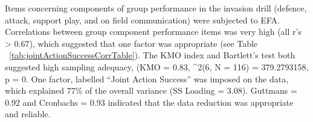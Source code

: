 \documentclass[english]{article}\usepackage[]{graphicx}\usepackage[]{color}
\makeatletter
\newenvironment{kframe}{%
 \def\at@end@of@kframe{}%
 \ifinner\ifhmode%
  \def\at@end@of@kframe{\end{minipage}}%
  \begin{minipage}{\columnwidth}%
 \fi\fi%
 \def\FrameCommand##1{\hskip\@totalleftmargin \hskip-\fboxsep
 \colorbox{shadecolor}{##1}\hskip-\fboxsep
     \hskip-\linewidth \hskip-\@totalleftmargin \hskip\columnwidth}%
 \MakeFramed {\advance\hsize-\width
   \@totalleftmargin\z@ \linewidth\hsize
   \@setminipage}}%
 {\par\unskip\endMakeFramed%
 \at@end@of@kframe}
\newenvironment{knitrout}{}{} %
\makeatother
\begin{document}
\begin{knitrout}
\color{fgcolor}\begin{kframe}


{\ttfamily\noindent\itshape\color{messagecolor}{\#\# Loading required package: Hmisc}}

{\ttfamily\noindent\color{warningcolor}{\#\# Warning: package 'Hmisc' was built under R version 3.3.2}}

{\ttfamily\noindent\itshape\color{messagecolor}{\#\# Loading required package: lattice}}

{\ttfamily\noindent\itshape\color{messagecolor}{\#\# Loading required package: survival}}

{\ttfamily\noindent\itshape\color{messagecolor}{\#\# Loading required package: Formula}}

{\ttfamily\noindent\itshape\color{messagecolor}{\#\# \\\#\# Attaching package: 'Hmisc'}}

{\ttfamily\noindent\itshape\color{messagecolor}{\#\# The following object is masked from 'package:psych':\\\#\# \\\#\#\ \ \ \  describe}}

{\ttfamily\noindent\itshape\color{messagecolor}{\#\# The following objects are masked from 'package:dplyr':\\\#\# \\\#\#\ \ \ \  combine, src, summarize}}

{\ttfamily\noindent\itshape\color{messagecolor}{\#\# The following objects are masked from 'package:xtable':\\\#\# \\\#\#\ \ \ \  label, label<-}}

{\ttfamily\noindent\itshape\color{messagecolor}{\#\# The following objects are masked from 'package:base':\\\#\# \\\#\#\ \ \ \  format.pval, round.POSIXt, trunc.POSIXt, units}}\end{kframe}
\end{knitrout}

Items concerning components of group performance in the invasion drill (defence, attack, support play, and on field communication) were subjected to EFA.  
Correlations between group component performance items was very high (all r's > 0.67), which suggested that one factor was appropriate (see Table ~\ref{tab:jointActionSuccessCorrTable}). 
The KMO index and Bartlett's test both suggested high sampling adequacy, (KMO =  0.83, \chi^2(6, N = 116) = 379.2793158, p = 0. One factor, labelled ``Joint Action Success'' was imposed on the data, which explained 77\% of the overall variance (SS Loading = 3.08). 
Guttmans \lambda = 0.92 and Cronbachs \alpha = 0.93 indicated that the data reduction was appropriate and reliable.
\end{document}
